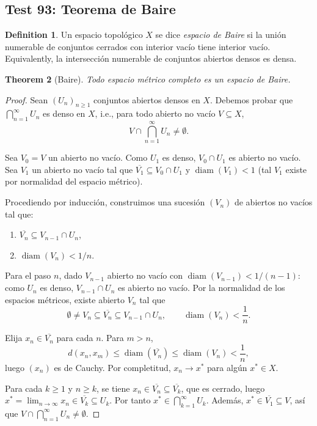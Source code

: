 \documentclass[11pt,a4paper]{article}
\theoremstyle{plain}
\newtheorem{theorem}{Theorem}[section]
\theoremstyle{definition}
\newtheorem{definition}[theorem]{Definition}
\begin{document}
\subsection*{Test 93: Teorema de Baire}

\begin{definition}
Un espacio topológico $X$ se dice \emph{espacio de Baire} si la unión numerable de conjuntos cerrados con interior vacío tiene interior vacío. Equivalently, la intersección numerable de conjuntos abiertos densos es densa.
\end{definition}

\begin{theorem}[Baire]
Todo espacio métrico completo es un espacio de Baire.
\end{theorem}

\begin{proof}
Sean $(U_{n})_{n\ge1}$ conjuntos abiertos densos en $X$. Debemos probar que $\bigcap_{n=1}^{\infty}U_{n}$ es denso en $X$, i.e., para todo abierto no vacío $V\subseteq X$,
\[
V\cap\bigcap_{n=1}^{\infty}U_{n}\neq\emptyset.
\]

Sea $V_{0}=V$ un abierto no vacío. Como $U_{1}$ es denso, $V_{0}\cap U_{1}$ es abierto no vacío. Sea $V_{1}$ un abierto no vacío tal que $\overline{V_{1}}\subseteq V_{0}\cap U_{1}$ y $\operatorname{diam}(V_{1})<1$ (tal $V_{1}$ existe por normalidad del espacio métrico).

Procediendo por inducción, construimos una sucesión $(V_{n})$ de abiertos no vacíos tal que:
\begin{enumerate}
\item $\overline{V_{n}}\subseteq V_{n-1}\cap U_{n}$,
\item $\operatorname{diam}(V_{n})<1/n$.
\end{enumerate}

Para el paso $n$, dado $V_{n-1}$ abierto no vacío con $\operatorname{diam}(V_{n-1})<1/(n-1)$: como $U_{n}$ es denso, $V_{n-1}\cap U_{n}$ es abierto no vacío. Por la normalidad de los espacios métricos, existe abierto $V_{n}$ tal que
\[
\emptyset\neq V_{n}\subseteq\overline{V_{n}}\subseteq V_{n-1}\cap U_{n},\qquad\operatorname{diam}(V_{n})<\frac{1}{n}.
\]

Elija $x_{n}\in\overline{V_{n}}$ para cada $n$. Para $m>n$,
\[
d(x_{n},x_{m})\le\operatorname{diam}(\overline{V_{n}})\le\operatorname{diam}(V_{n})<\frac{1}{n},
\]
luego $(x_{n})$ es de Cauchy. Por completitud, $x_{n}\to x^{*}$ para algún $x^{*}\in X$.

Para cada $k\ge 1$ y $n\ge k$, se tiene $x_{n}\in\overline{V_{n}}\subseteq\overline{V_{k}}$, que es cerrado, luego $x^{*}=\lim_{n\to\infty}x_{n}\in\overline{V_{k}}\subseteq U_{k}$. Por tanto $x^{*}\in\bigcap_{k=1}^{\infty}U_{k}$. Además, $x^{*}\in\overline{V_{1}}\subseteq V$, así que $V\cap\bigcap_{n=1}^{\infty}U_{n}\neq\emptyset$.
\end{proof}
\end{document}
